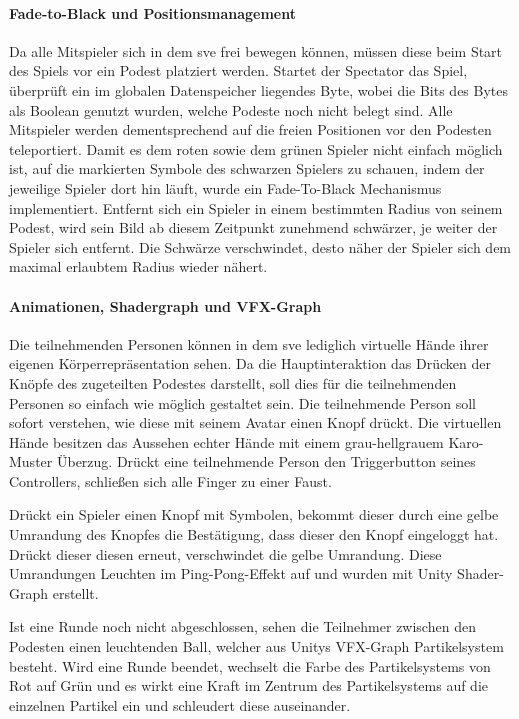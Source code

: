 \documentclass[a4paper,11pt]{article}%
\renewcommand{\\}{\vspace*{0.5\baselineskip} \newline}
\begin{document}
\paragraph{Fade-to-Black und Positionsmanagement}
	Da alle Mitspieler sich in dem \ac{sve} frei bewegen können, müssen diese beim Start des Spiels vor ein Podest platziert werden. Startet der Spectator das Spiel, überprüft ein im globalen Datenspeicher liegendes Byte, wobei die Bits des Bytes als Boolean genutzt wurden, welche Podeste noch nicht belegt sind. Alle Mitspieler werden dementsprechend auf die freien Positionen vor den Podesten teleportiert.
Damit es dem roten sowie dem grünen Spieler nicht einfach möglich ist, auf die markierten Symbole des schwarzen Spielers zu schauen, indem der jeweilige Spieler dort hin läuft, wurde ein Fade-To-Black Mechanismus implementiert. Entfernt sich ein Spieler in einem bestimmten Radius von seinem Podest, wird sein Bild ab diesem Zeitpunkt zunehmend schwärzer, je weiter der Spieler sich entfernt. Die Schwärze verschwindet, desto näher der Spieler sich dem maximal erlaubtem Radius wieder nähert.

\paragraph{Animationen, Shadergraph und VFX-Graph}
Die teilnehmenden Personen können in dem \ac{sve} lediglich virtuelle Hände ihrer eigenen Körperrepräsentation sehen. Da die Hauptinteraktion das Drücken der Knöpfe des zugeteilten Podestes darstellt, soll dies für die teilnehmenden Personen so einfach wie möglich gestaltet sein. Die teilnehmende Person soll sofort verstehen, wie diese mit seinem Avatar einen Knopf drückt. Die virtuellen Hände besitzen das Aussehen echter Hände mit einem grau-hellgrauem Karo-Muster Überzug. Drückt eine teilnehmende Person den Triggerbutton seines Controllers, schließen sich alle Finger zu einer Faust.

Drückt ein Spieler einen Knopf mit Symbolen, bekommt dieser durch eine gelbe Umrandung des Knopfes die Bestätigung, dass dieser den Knopf eingeloggt hat. Drückt dieser diesen erneut, verschwindet die gelbe Umrandung. Diese Umrandungen Leuchten im Ping-Pong-Effekt auf und wurden mit Unity Shader-Graph erstellt.

Ist eine Runde noch nicht abgeschlossen, sehen die Teilnehmer zwischen den Podesten einen leuchtenden Ball, welcher aus Unitys VFX-Graph Partikelsystem besteht. Wird eine Runde beendet, wechselt die Farbe des Partikelsystems von Rot auf Grün und es wirkt eine Kraft im Zentrum des Partikelsystems auf die einzelnen Partikel ein und schleudert diese auseinander.
\end{document}
